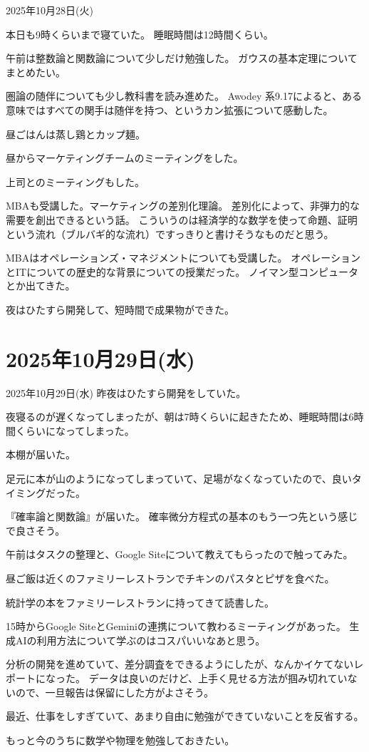 \documentclass[dvipdfmx, autodetect-engine, aspectratio=169, 10.5pt]{beamer}
\begin{document}
\begin{frame}{2025年10月28日(火)}

本日も9時くらいまで寝ていた。
睡眠時間は12時間くらい。

午前は整数論と関数論について少しだけ勉強した。
ガウスの基本定理についてまとめたい。

圏論の随伴についても少し教科書を読み進めた。
Awodey 系9.17によると、ある意味ではすべての関手は随伴を持つ、というカン拡張について感動した。

昼ごはんは蒸し鶏とカップ麺。

昼からマーケティングチームのミーティングをした。

上司とのミーティングもした。

MBAも受講した。マーケティングの差別化理論。
差別化によって、非弾力的な需要を創出できるという話。
こういうのは経済学的な数学を使って命題、証明という流れ（ブルバギ的な流れ）ですっきりと書けそうなものだと思う。

MBAはオペレーションズ・マネジメントについても受講した。
オペレーションとITについての歴史的な背景についての授業だった。
ノイマン型コンピュータとか出てきた。

夜はひたすら開発して、短時間で成果物ができた。
\end{frame}

\section{2025年10月29日(水)}
\begin{frame}{2025年10月29日(水)}
\scriptsize
昨夜はひたすら開発をしていた。

夜寝るのが遅くなってしまったが、朝は7時くらいに起きたため、睡眠時間は6時間くらいになってしまった。

本棚が届いた。

足元に本が山のようになってしまっていて、足場がなくなっていたので、良いタイミングだった。

『確率論と関数論』が届いた。
確率微分方程式の基本のもう一つ先という感じで良さそう。

午前はタスクの整理と、Google Siteについて教えてもらったので触ってみた。

昼ご飯は近くのファミリーレストランでチキンのパスタとピザを食べた。

統計学の本をファミリーレストランに持ってきて読書した。

15時からGoogle SiteとGeminiの連携について教わるミーティングがあった。
生成AIの利用方法について学ぶのはコスパいいなあと思う。

分析の開発を進めていて、差分調査をできるようにしたが、なんかイケてないレポートになった。
データは良いのだけど、上手く見せる方法が掴み切れていないので、一旦報告は保留にした方がよさそう。

最近、仕事をしすぎていて、あまり自由に勉強ができていないことを反省する。

もっと今のうちに数学や物理を勉強しておきたい。
\end{frame}
\end{document}
